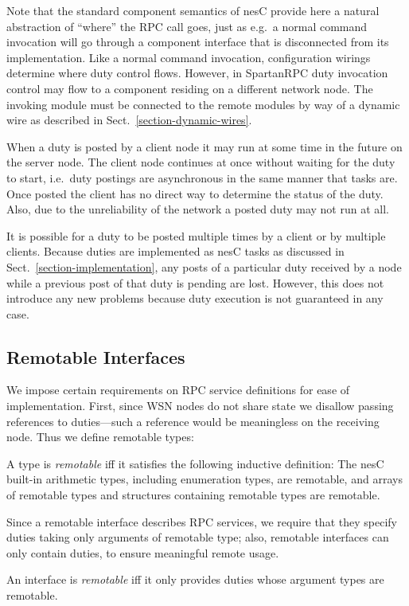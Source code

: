Note that the standard component semantics of nesC provide here a natural abstraction of
``where'' the RPC call goes, just as e.g.~a normal command invocation will go through a
component interface that is disconnected from its implementation. Like a normal command
invocation, configuration wirings determine where duty control flows. However, in SpartanRPC
duty invocation control may flow to a component residing on a different network node. The
invoking module must be connected to the remote modules by way of a dynamic wire as described in
Sect.~\ref{section-dynamic-wires}.

When a duty is posted by a client node it may run at some time in the future on the server node.
The client node continues at once without waiting for the duty to start, i.e.~duty postings are
asynchronous in the same manner that tasks are. Once posted the client has no direct way to
determine the status of the duty. Also, due to the unreliability of the network a posted duty
may not run at all.

It is possible for a duty to be posted multiple times by a client or by multiple clients.
Because duties are implemented as nesC tasks as discussed in Sect.~\ref{section-implementation},
any posts of a particular duty received by a node while a previous post of that duty is pending
are lost. However, this does not introduce any new problems because duty execution is not
guaranteed in any case.

\subsection{Remotable Interfaces}
\label{section-remotable}

We impose certain requirements on RPC service definitions for ease of implementation. First,
since WSN nodes do not share state we disallow passing references to duties---such a reference
would be meaningless on the receiving node. Thus we define remotable types:
\begin{definition}A type is \emph{remotable} iff it satisfies the following inductive
  definition: The nesC built-in arithmetic types, including enumeration types, are remotable,
  and arrays of remotable types and structures containing remotable types are remotable.
\end{definition}
Since a remotable interface describes RPC services, we require that they specify duties taking
only arguments of remotable type; also, remotable interfaces can only contain duties, to ensure
meaningful remote usage.
\begin{definition}
  An interface is \emph{remotable} iff it only provides duties whose argument types are
  remotable.
\end{definition}
